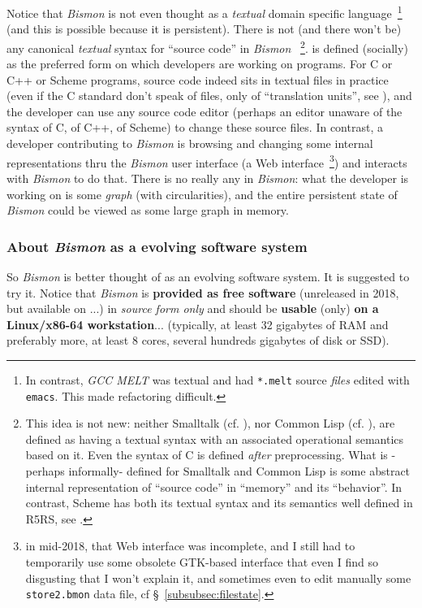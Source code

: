 Notice that \textit{Bismon} is not even thought as a \emph{textual}
domain specific language~\footnote{In contrast, \emph{GCC MELT} was
  textual and had \texttt{*.melt} source \emph{files} edited with
  \texttt{emacs}. This made refactoring difficult.} (and this is
possible because it is persistent). There is not (and there won't be)
any canonical \emph{textual} syntax for ``source code'' in
\textit{Bismon} ~\footnote{This idea is not new: neither Smalltalk
  (cf. \cite{Goldberg:1983:Smalltalk}), nor Common Lisp
  (cf. \cite{Steele:1990:CommonLisp}), are defined as having a textual
  syntax with an associated operational semantics based on it. Even
  the syntax of C is defined \emph{after} preprocessing. What is
  -perhaps informally- defined for Smalltalk and Common Lisp is some
  abstract internal representation of ``source code'' in ``memory''
  and its ``behavior''. In contrast, Scheme has both its textual
  syntax and its semantics well defined in R5RS, see
  \cite{Adams:1998:R5RS}.}.  is
defined (socially) as the preferred form on which developers are
working on programs. For C or C++ or Scheme programs, source code
indeed sits in textual files in practice (even if the C standard don't
speak of files, only of ``translation units'', see \cite{C11:std}),
and the developer can use any source code editor (perhaps an editor
unaware of the syntax of C, of C++, of Scheme) to change these source
files. In contrast, a developer contributing to \textit{Bismon} is
browsing and changing some internal representations thru the
\textit{Bismon} user interface (a Web interface~\footnote{in mid-2018,
  that Web interface was incomplete, and I still had to temporarily
  use some obsolete GTK-based interface that even I find so disgusting
  that I won't explain it, and sometimes even to edit manually some
  \texttt{store2.bmon} data file, cf §~\ref{subsubsec:filestate}.})
and interacts with \textit{Bismon} to do that. There is no really any
 in
\textit{Bismon}: what the developer is working on is some \emph{graph}
(with circularities), and the entire persistent state of \emph{Bismon}
could be viewed as some large graph in memory. 


\subsubsection{About \emph{Bismon} as a evolving software system}

So \emph{Bismon} is better thought of as an evolving software
system. It is suggested to try it.  Notice that \textit{Bismon} is
\textbf{provided as free software} (unreleased in 2018, but available
on  ...) in \emph{source form only}
and should be \textbf{usable} (only) \textbf{on a Linux/x86-64
  workstation}... (typically, at least 32 gigabytes of RAM and
preferably more, at least 8 cores, several hundreds gigabytes of disk
or SSD).

